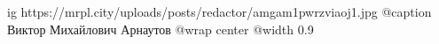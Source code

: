  
 
 
 
 

\ifcmt
  ig https://mrpl.city/uploads/posts/redactor/amgam1pwrzviaoj1.jpg
	@caption Виктор Михайлович Арнаутов
  @wrap center
  @width 0.9
\fi
